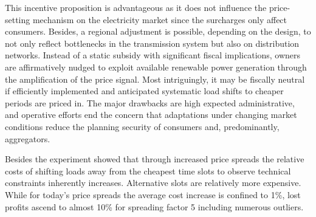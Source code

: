 This incentive proposition is advantageous as it does not influence the price-setting mechanism on the electricity market since the surcharges only affect consumers. Besides, a regional adjustment is possible, depending on the design, to not only reflect bottlenecks in the transmission system but also on distribution networks. Instead of a static subsidy with significant fiscal implications, owners are affirmatively nudged to exploit available renewable power generation through the amplification of the price signal. Most intriguingly, it may be fiscally neutral if efficiently implemented and anticipated systematic load shifts to cheaper periods are priced in. The major drawbacks are high expected administrative, and operative efforts end the concern that adaptations under changing market conditions reduce the planning security of consumers and, predominantly, aggregators.

Besides the experiment showed that through increased price spreads the relative costs of shifting loads away from the cheapest time slots to observe technical constraints inherently increases. Alternative slots are relatively more expensive. While for today's price spreads the average cost increase is confined to 1\%, lost profits ascend to almost 10\% for spreading factor 5 including numerous outliers.
